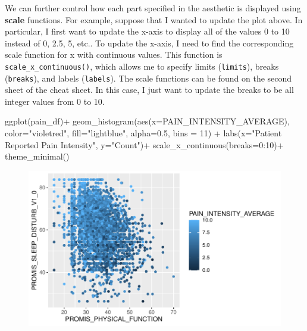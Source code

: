 \documentclass[
  letterpaper,
]{krantz}
\makeatletter
\newenvironment{Shaded}{\begin{snugshade}}{\end{snugshade}}
\newcommand{\AttributeTok}[1]{\textcolor[rgb]{0.40,0.45,0.13}{#1}}
\newcommand{\DecValTok}[1]{\textcolor[rgb]{0.68,0.00,0.00}{#1}}
\newcommand{\FloatTok}[1]{\textcolor[rgb]{0.68,0.00,0.00}{#1}}
\newcommand{\FunctionTok}[1]{\textcolor[rgb]{0.28,0.35,0.67}{#1}}
\newcommand{\NormalTok}[1]{\textcolor[rgb]{0.00,0.23,0.31}{#1}}
\newcommand{\SpecialCharTok}[1]{\textcolor[rgb]{0.37,0.37,0.37}{#1}}
\newcommand{\StringTok}[1]{\textcolor[rgb]{0.13,0.47,0.30}{#1}}
\newenvironment{kframe}{%
\medskip{}
\setlength{\fboxsep}{.8em}
 \def\at@end@of@kframe{}%
 \ifinner\ifhmode%
  \def\at@end@of@kframe{\end{minipage}}%
  \begin{minipage}{\columnwidth}%
 \fi\fi%
 \def\FrameCommand##1{\hskip\@totalleftmargin \hskip-\fboxsep
 \colorbox{shadecolor}{##1}\hskip-\fboxsep
     \hskip-\linewidth \hskip-\@totalleftmargin \hskip\columnwidth}%
 \MakeFramed {\advance\hsize-\width
   \@totalleftmargin\z@ \linewidth\hsize
   \@setminipage}}%
 {\par\unskip\endMakeFramed%
 \at@end@of@kframe}
\renewenvironment{Shaded}{\begin{kframe}}{\end{kframe}}
\makeatother
\begin{document}
We can further control how each part specified in the aesthetic is
displayed using \textbf{scale} functions. For example, suppose that I
wanted to update the plot above. In particular, I first want to update
the x-axis to display all of the values 0 to 10 instead of 0, 2.5, 5,
etc.. To update the x-axis, I need to find the corresponding scale
function for x with continuous values. This function is
\texttt{scale\_x\_continuous()}, which allows me to specify limits
(\texttt{limits}), breaks (\texttt{breaks}), and labels
(\texttt{labels}). The scale functions can be found on the second sheet
of the cheat sheet. In this case, I just want to update the breaks to be
all integer values from 0 to 10.

\begin{Shaded}
\begin{Highlighting}[]
\FunctionTok{ggplot}\NormalTok{(pain\_df)}\SpecialCharTok{+}
  \FunctionTok{geom\_histogram}\NormalTok{(}\FunctionTok{aes}\NormalTok{(}\AttributeTok{x=}\NormalTok{PAIN\_INTENSITY\_AVERAGE), }\AttributeTok{color=}\StringTok{"violetred"}\NormalTok{, }
                 \AttributeTok{fill=}\StringTok{"lightblue"}\NormalTok{, }\AttributeTok{alpha=}\FloatTok{0.5}\NormalTok{, }\AttributeTok{bins =} \DecValTok{11}\NormalTok{) }\SpecialCharTok{+}
  \FunctionTok{labs}\NormalTok{(}\AttributeTok{x=}\StringTok{"Patient Reported Pain Intensity"}\NormalTok{, }\AttributeTok{y=}\StringTok{"Count"}\NormalTok{)}\SpecialCharTok{+}
  \FunctionTok{scale\_x\_continuous}\NormalTok{(}\AttributeTok{breaks=}\DecValTok{0}\SpecialCharTok{:}\DecValTok{10}\NormalTok{)}\SpecialCharTok{+}
  \FunctionTok{theme\_minimal}\NormalTok{()}
\end{Highlighting}
\end{Shaded}

\begin{figure}[H]

{\centering \includegraphics[width=1\textwidth,height=\textheight]{book/7_visualization_ggplot_files/figure-pdf/unnamed-chunk-8-1.pdf}

}

\end{figure}
\end{document}
